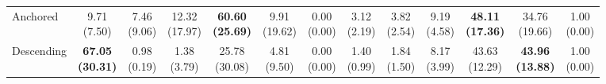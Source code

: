 {\begin{tabular}{l|cccccc|cccccc}
Anchored & \makecell{9.71 \\ (7.50)} & \makecell{7.46 \\ (9.06)} & \makecell{12.32 \\ (17.97)} & {\cellcolor[HTML]{C8E6C9}} \bfseries \makecell{60.60 \\ (25.69)} & \makecell{9.91 \\ (19.62)} & \makecell{0.00 \\ (0.00)} & \makecell{3.12 \\ (2.19)} & \makecell{3.82 \\ (2.54)} & \makecell{9.19 \\ (4.58)} & {\cellcolor[HTML]{C8E6C9}} \bfseries \makecell{48.11 \\ (17.36)} & \makecell{34.76 \\ (19.66)} & \makecell{1.00 \\ (0.00)} \\
Descending & \bfseries \makecell{67.05 \\ (30.31)} & \makecell{0.98 \\ (0.19)} & \makecell{1.38 \\ (3.79)} & {\cellcolor[HTML]{C8E6C9}} \makecell{25.78 \\ (30.08)} & \makecell{4.81 \\ (9.50)} & \makecell{0.00 \\ (0.00)} & \makecell{1.40 \\ (0.99)} & \makecell{1.84 \\ (1.50)} & \makecell{8.17 \\ (3.99)} & {\cellcolor[HTML]{C8E6C9}} \makecell{43.63 \\ (12.29)} & \bfseries \makecell{43.96 \\ (13.88)} & \makecell{1.00 \\ (0.00)} \\
\bottomrule
\end{tabular}
}%

